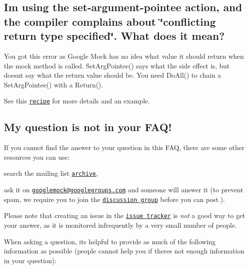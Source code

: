 \subsection*{I\textquotesingle{}m using the set-\/argument-\/pointee action, and the compiler complains about \char`\"{}conflicting return type specified\char`\"{}. What does it mean?}

You got this error as Google Mock has no idea what value it should return when the mock method is called. {\ttfamily Set\+Arg\+Pointee()} says what the side effect is, but doesn\textquotesingle{}t say what the return value should be. You need {\ttfamily Do\+All()} to chain a {\ttfamily Set\+Arg\+Pointee()} with a {\ttfamily Return()}.

See this \href{CookBook.md#mocking-side-effects}{\tt recipe} for more details and an example.

\subsection*{My question is not in your F\+A\+Q!}

If you cannot find the answer to your question in this F\+AQ, there are some other resources you can use\+:


\begin{DoxyEnumerate}
\item search the mailing list \href{http://groups.google.com/group/googlemock/topics}{\tt archive},
\end{DoxyEnumerate}
\begin{DoxyEnumerate}
\item ask it on \href{mailto:googlemock@googlegroups.com}{\tt googlemock@googlegroups.\+com} and someone will answer it (to prevent spam, we require you to join the \href{http://groups.google.com/group/googlemock}{\tt discussion group} before you can post.).
\end{DoxyEnumerate}

Please note that creating an issue in the \href{https://github.com/google/googletest/issues}{\tt issue tracker} is {\itshape not} a good way to get your answer, as it is monitored infrequently by a very small number of people.

When asking a question, it\textquotesingle{}s helpful to provide as much of the following information as possible (people cannot help you if there\textquotesingle{}s not enough information in your question)\+:



